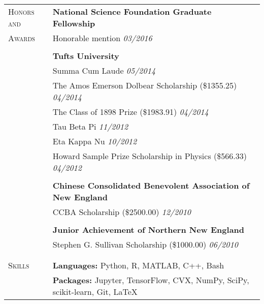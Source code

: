 \documentclass[letterpaper,11pt,oneside]{article}
\begin{document}
\begin{longtable}{@{} p{2.5cm} p{14.8cm}}

 \large{\textsc{Honors and}}  & \textbf{National Science Foundation Graduate Fellowship}   \\*
 \large{\textsc{Awards}} & Honorable mention \hfill \textit{03/2016} \\*
& \\*
& \textbf{Tufts University} \\
& Summa Cum Laude \hfill \textit{05/2014} \\
& The Amos Emerson Dolbear Scholarship (\$1355.25) \hfill \textit{04/2014} \\
& The Class of 1898 Prize (\$1983.91) \hfill \textit{04/2014} \\
& Tau Beta Pi \hfill \textit{11/2012} \\
& Eta Kappa Nu \hfill \textit{10/2012} \\
& Howard Sample Prize Scholarship in Physics (\$566.33) \hfill \textit{04/2012} \\
& \\
& \textbf{Chinese Consolidated Benevolent Association of New England} \\
& CCBA Scholarship (\$2500.00) \hfill \textit{12/2010} \\
& \\
& \textbf{Junior Achievement of Northern New England} \\
& Stephen G. Sullivan Scholarship (\$1000.00) \hfill \textit{06/2010} \\
& \\
& \\
     
  \large{\textsc{Skills}}   & \textbf{Languages:} Python, R, MATLAB, C++, Bash \\
   & \textbf{Packages:} Jupyter, TensorFlow, CVX, NumPy, SciPy, scikit-learn, Git, \LaTeX \\
\end{longtable}
\end{document}
